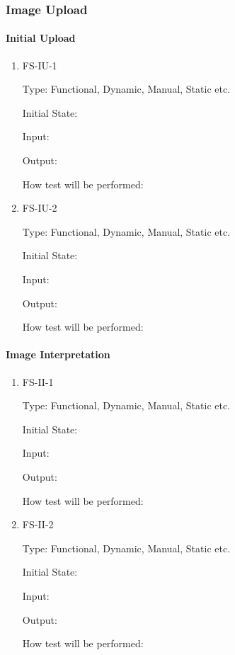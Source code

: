 \documentclass[11pt]{article}
\begin{document}
\subsubsection{Image Upload}

\paragraph{Initial Upload}

\begin{enumerate}

\item{FS-IU-1\\}

Type: Functional, Dynamic, Manual, Static etc.
					
Initial State: 
					
Input: 
					
Output: 
					
How test will be performed: 
					
\item{FS-IU-2\\}

Type: Functional, Dynamic, Manual, Static etc.
					
Initial State: 
					
Input: 
					
Output: 
					
How test will be performed: 

\end{enumerate}

\paragraph{Image Interpretation}

\begin{enumerate}

\item{FS-II-1\\}

Type: Functional, Dynamic, Manual, Static etc.
					
Initial State: 
					
Input: 
					
Output: 
					
How test will be performed: 
					
\item{FS-II-2\\}

Type: Functional, Dynamic, Manual, Static etc.
					
Initial State: 
					
Input: 
					
Output: 
					
How test will be performed: 

\end{enumerate}
\end{document}
